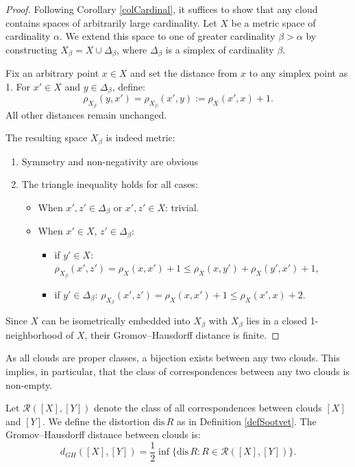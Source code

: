 \begin{proof}
  Following Corollary \ref{colCardinal}, it suffices to show that any
  cloud contains spaces of arbitrarily large cardinality. Let $X$ be
  a metric space of cardinality $\alpha$. We extend this space to one
  of greater cardinality $\beta > \alpha$ by constructing $X_\beta =
  X \cup \Delta_\beta$, where $\Delta_\beta$ is a simplex of
  cardinality $\beta$.

  Fix an arbitrary point $x \in X$ and set the distance from $x$ to
  any simplex point as 1. For $x' \in X$ and $y \in \Delta_\beta$, define:
  $$
  \rho_{X_\beta}(y,x') = \rho_{X_\beta}(x',y) := \rho_X(x',x) + 1.
  $$
  All other distances remain unchanged.

  The resulting space $X_\beta$ is indeed metric:
  \begin{enumerate}
    \item Symmetry and non-negativity are obvious
    \item The triangle inequality holds for all cases:
      \begin{itemize}
        \item When $x', z' \in \Delta_\beta$ or $x', z' \in X$: trivial.
        \item When $x' \in X$, $z' \in \Delta_\beta$:
          \begin{itemize}
            \item if $y' \in X$: $\rho_{X_\beta}(x',z') =
              \rho_X(x,x') + 1 \leq \rho_X(x,y') +
              \rho_X(y',x') + 1$,
            \item if $y' \in \Delta_\beta$: $\rho_{X_\beta}(x',z') =
              \rho_X(x,x') + 1 \leq \rho_X(x',x) + 2$.
          \end{itemize}
      \end{itemize}
  \end{enumerate}

  Since $X$ can be isometrically embedded into $X_\beta$ with
  $X_\beta$ lies in a closed 1-neighborhood of $X$, their
  Gromov--Hausdorff distance is finite.
\end{proof}

\begin{remark}
  As all clouds are proper classes, a bijection exists between any
  two clouds. This implies, in particular, that the class of
  correspondences between any two clouds is non-empty.
\end{remark}

\begin{definition}
  Let $\mathcal{R}([X],[Y])$ denote the class of all correspondences
  between clouds $[X]$ and $[Y]$. We define the distortion
  $\text{dis}\, R$ as in Definition \ref{defSootvet}. The
  Gromov--Hausdorff distance between clouds is:
  $$
  d_{GH}([X],[Y]) = \frac{1}{2}\inf\{\text{dis}\, R : R \in
  \mathcal{R}([X],[Y])\}.
  $$
\end{definition}

